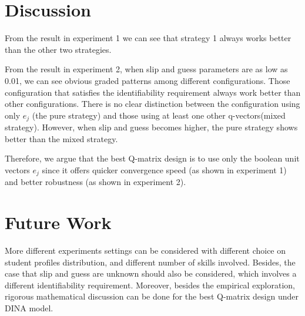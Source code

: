 \documentclass{edm_template}
\begin{document}
%  

\section{Discussion}
From the result in experiment 1 we can see that strategy 1 always works better than the other two strategies. 

From the result in experiment 2, when slip and guess parameters are as low as 0.01, we can see obvious graded patterns among different configurations. Those configuration that satisfies the identifiability requirement always work better than other configurations. There is no clear distinction between the configuration using only $e_{j}$ (the pure strategy) and those using at least one other q-vectors(mixed strategy). However, when slip and guess becomes higher, the pure strategy shows better than the mixed strategy.

Therefore, we argue that the best Q-matrix design is to use only the boolean unit vectors ${e_j}$ since it offers quicker convergence speed (as shown in experiment 1) and better robustness (as shown in experiment 2).

\section{Future Work}
More different experiments settings can be considered with different choice on student profiles distribution, and different number of skills involved. Besides, the case that slip and guess are unknown should also be considered, which involves a different identifiability requirement. Moreover, besides the empirical exploration, rigorous mathematical discussion can be done for the best Q-matrix design under DINA model. 


\end{document}
